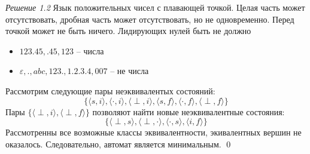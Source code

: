 \documentclass[12pt,a4paper]{article}
\begin{document}
\noindent\textit{Решение 1.2}
Язык положительных чисел с плавающей точкой.
Целая часть может отсутствовать, дробная часть может отсутствовать,
но не одновременно. Перед точкой может не быть ничего.
Лидирующих нулей быть не должно
\begin{itemize}
  \item $123.45, .45, 123$ -- числа
  \item $\varepsilon, ., abc, 123., 1.2.3.4, 007$ -- не числа
\end{itemize}
\begin{figure}[ht]
  \centering
\end{figure}
Рассмотрим следующие пары неэквивалентых состояний:
\[\{
  \langle s,     i \rangle,
  \langle \cdot, i \rangle,
  \langle \perp, i \rangle,
  \langle s,     f \rangle,
  \langle \cdot, f \rangle,
  \langle \perp, f \rangle
\}\]
Пары
$\{
  \langle \perp, i \rangle,
  \langle \perp, f \rangle
\}$
позволяют найти новые неэквивалентные состояния:
\[\{
  \langle \perp, s     \rangle,
  \langle \perp, \cdot \rangle,
  \langle \cdot, s     \rangle,
  \langle i,     f     \rangle
\}\]
Рассмотренны все возможные классы эквивалентности,
экивалентных вершин не оказалось. Следовательно, автомат является минимальным.
\qed
\end{document}
